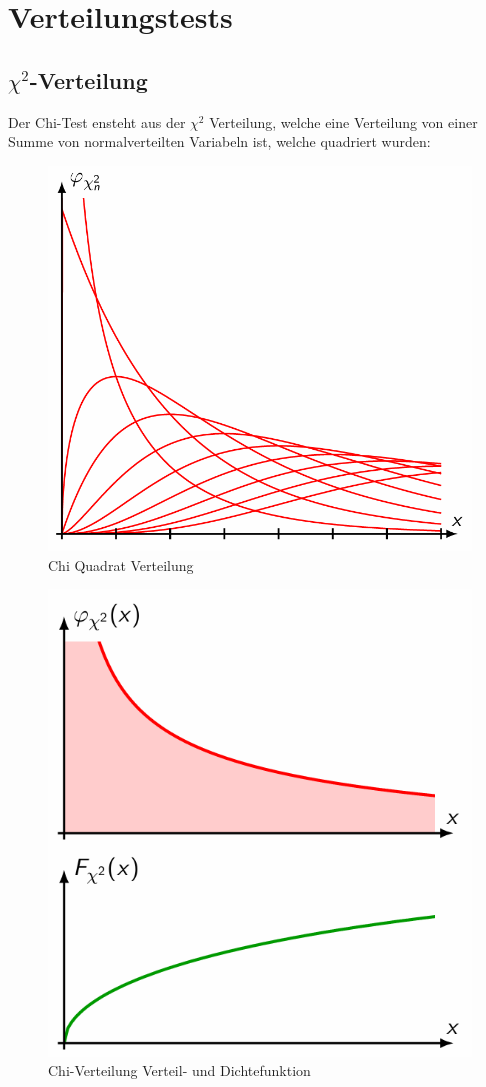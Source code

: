 \documentclass[../Main.tex]{subfiles}
\begin{document}
\section{Verteilungstests}
\subsection{\(\chi^2\)-Verteilung}
Der Chi-Test ensteht aus der \(\chi^2\) Verteilung, welche eine Verteilung von
einer Summe von normalverteilten Variabeln ist, welche quadriert wurden:

\begin{figure}[H]
    \centering
    \includegraphics[width=0.5\linewidth]{Images/x-verteilung.png}
    \caption{Chi Quadrat Verteilung}
\end{figure}


\begin{figure}[H]
    \centering
    \includegraphics[width=0.5\linewidth]{Images/chi-verteilung.png}
    \caption{Chi-Verteilung Verteil- und Dichtefunktion}
\end{figure}
\end{document}
